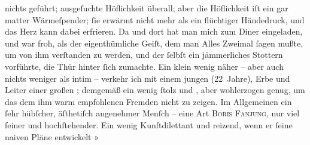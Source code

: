 \begin{ledgroupsized}[t]{13cm}
               nichts geführt; ausgeſuchte Höflichkeit überall; aber die Höflichkeit iſt ein gar
               matter Wärmeſpender; ſie erwärmt nicht mehr als ein flüchtiger Händedruck, und das
               Herz kann dabei erfrieren. Da und dort hat man mich zum Diner eingeladen, und war
               froh, als der eigenthümliche Geiſt, dem man Alles Zweimal ſagen mußte, um von ihm
               verſtanden zu werden, und der ſelbſt ein jämmerliches Stottern vorführte, die {\pb}Thür hinter ſich zumachte. Ein klein wenig näher –
               aber auch nichts weniger als intim – verkehr ich mit einem jungen \label{K_L02664-1v}\label{K_L02664-1h} (22 Jahre),
                  Erbe und Leiter einer großen \label{K_L02664-2v}\label{K_L02664-2h}; demgemäß ein
               wenig ſtolz und \label{K_L02664-3v}\label{K_L02664-3h},
               aber wohlerzogen genug, um das dem ihm warm empfohlenen Fremden nicht zu zeigen. Im
               Allgemeinen ein ſehr hübſcher, \strikeout{\textcolor{gray}{aſ}} äſthetiſch angenehmer Menſch – eine Art \textsc{Boris Fanjung}, nur viel feiner und hochſtehender. Ein wenig Kunſtdilettant und reizend, wenn er ſeine
               naiven Pläne entwickelt »\label{K_L02664-4v}
\end{ledgroupsized}
